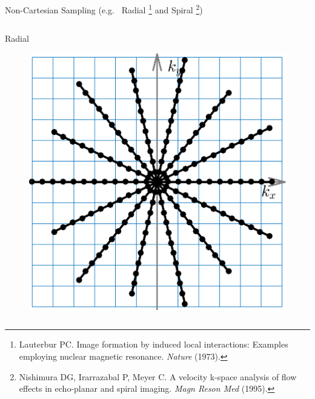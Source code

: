 \begin{frame}{Non-Cartesian Sampling (e.g.~ Radial \footnote{Lauterbur PC. Image formation by induced local interactions: Examples employing nuclear magnetic resonance. \textit{Nature} (1973).} and Spiral \footnote{Nishimura DG, Irarrazabal P, Meyer C. A velocity k-space analysis of flow effects in echo-planar and spiral imaging. \textit{Magn Reson Med} (1995).})}

    \begin{columns}
		\begin{column}{0.35\textwidth}
			\centering
			Radial
			\begin{figure}
				\includegraphics[width=\columnwidth]{fig/mri-trj-radial.png}
			\end{figure}
		\end{column}


\end{columns}
\end{frame}
